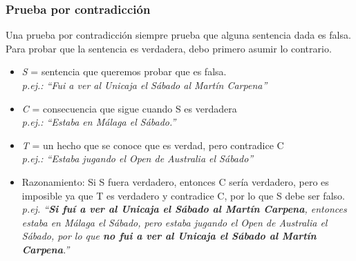 \documentclass[xcolor=table]{beamer}
\begin{document}
\begin{frame}  \frametitle{Prueba por contradicción}\small  

Una prueba por contradicción siempre prueba que alguna sentencia dada es falsa. Para probar que la sentencia es verdadera, debo primero asumir lo contrario.

\scriptsize 
\begin{itemize}
    \item \textit{S} = sentencia que queremos probar que es falsa. \\ \textit{p.ej.: “Fui a ver al Unicaja el Sábado al Martín Carpena”}
    \item \textit{C} = consecuencia que sigue cuando S es verdadera \\ \textit{p.ej.: “Estaba en Málaga el Sábado.”}
    \item \textit{T} = un hecho que se conoce que es verdad, pero contradice C 
    \\ \textit{p.ej.: “Estaba jugando el Open de Australia  el Sábado”}
    \item Razonamiento: Si S fuera verdadero, entonces C sería verdadero, pero es imposible ya que T es verdadero y contradice C, por lo que S debe ser falso. 
    \\ \textit{p.ej. “\textbf{Si fuí a ver al Unicaja el Sábado al Martín Carpena}, entonces estaba en Málaga el Sábado, pero estaba  jugando el Open de Australia  el Sábado, por lo que \textbf{no fui a ver al Unicaja el Sábado al Martín Carpena}.”}

\end{itemize}



\end{frame} 
\end{document}
